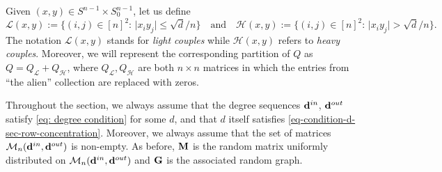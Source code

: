 \documentclass[12pt]{article}
\theoremstyle{definition}
\theoremstyle{plain}
\def\rangr{{\bf{}G}}
\def\ranmtx{{\bf{}M}}
\def\InDeg{{\bf d}^{in}}
\def\OutDeg{{\bf d}^{out}}
\def\MatrixSet{{\mathcal M}_n}
\begin{document}
Given $(x,y)\in S^{n-1}\times S_0^{n-1}$, let us define
$$
\mathcal{L}(x,y):=\big\{(i,j)\in [n]^2:\, \vert x_iy_j\vert\leq \sqrt{d}/n\big\}
\quad \text{and}\quad 
\mathcal{H}(x,y):=\big\{(i,j)\in [n]^2:\, \vert x_iy_j\vert> \sqrt{d}/n\big\}.
$$
The notation $\mathcal{L}(x,y)$ stands for \textit{light couples} while $\mathcal{H}(x,y)$ refers to \textit{heavy couples}. 
Moreover, we will represent the corresponding partition of $Q$ as
$Q=Q_\mathcal{L}+Q_\mathcal{H}$,
where $Q_\mathcal{L},Q_\mathcal{H}$ are both $n\times n$ matrices in which the entries
from ``the alien'' collection are replaced with zeros.

Throughout the section, we always assume that the degree sequences $\InDeg$, $\OutDeg$
satisfy \eqref{eq: degree condition} for some $d$, and that $d$ itself satisfies
\eqref{eq-condition-d-sec-row-concentration}.
Moreover, we always assume that the set of matrices $\MatrixSet(\InDeg,\OutDeg)$ is non-empty.
As before, $\ranmtx$ is the random matrix 
uniformly distributed on $\MatrixSet(\InDeg,\OutDeg)$ and $\rangr$ is the associated random graph.
\end{document}
